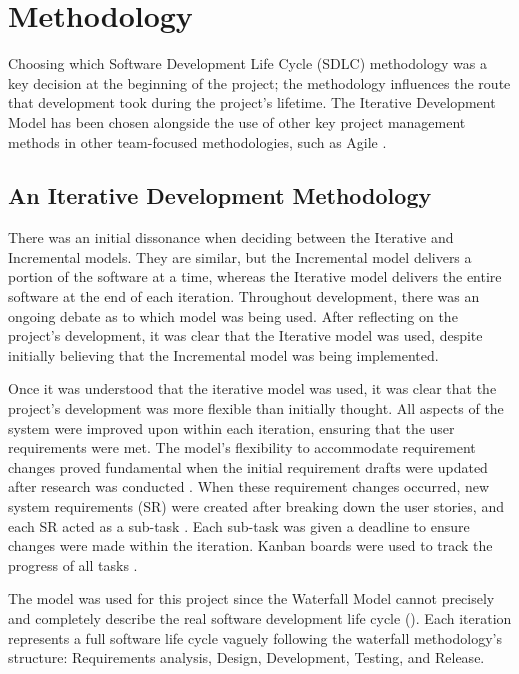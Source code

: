 \chapter{Methodology}
\label{chap:methodology}

Choosing which Software Development Life Cycle (SDLC) methodology was a key decision at the beginning of the project; the methodology influences the route that development took during the project's lifetime. The Iterative Development Model has been chosen alongside the use of other key project management methods in other team-focused methodologies, such as Agile .

\section{An Iterative Development Methodology}
\label{methodology:chosen}

There was an initial dissonance when deciding between the Iterative and Incremental models. They are similar, but the Incremental model delivers a portion of the software at a time, whereas the Iterative model delivers the entire software at the end of each iteration. Throughout development, there was an ongoing debate as to which model was being used. After reflecting on the project's development, it was clear that the Iterative model was used, despite initially believing that the Incremental model was being implemented. 

Once it was understood that the iterative model was used, it was clear that the project's development was more flexible than initially thought. All aspects of the system were improved upon within each iteration, ensuring that the user requirements were met. The model's flexibility to accommodate requirement changes proved fundamental when the initial requirement drafts were updated after research was conducted . When these requirement changes occurred, new system requirements (SR) were created after breaking down the user stories, and each SR acted as a sub-task . Each sub-task was given a deadline to ensure changes were made within the iteration. Kanban boards were used to track the progress of all tasks .

The model was used for this project since the Waterfall Model cannot precisely and completely describe the real software development life cycle (\cite{dapeng_liu_case_2011}). Each iteration represents a full software life cycle vaguely following the waterfall methodology's structure: Requirements analysis, Design, Development, Testing, and Release.

